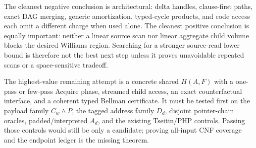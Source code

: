 \documentclass[11pt]{article}
\begin{document}
The cleanest negative conclusion is architectural: delta handles,
clause-first paths, exact DAG merging, generic amortization, typed-cycle
products, and code access each omit a different charge when used alone.  The
cleanest positive conclusion is equally important: neither a linear source
scan nor linear aggregate child volume blocks the desired Williams region.
Searching for a stronger source-read lower bound is therefore not the best
next step unless it proves unavoidable repeated scans or a space-sensitive
tradeoff.

The highest-value remaining attempt is a concrete shared $H(A,F)$ with a
one-pass or few-pass Acquire phase, streamed child access, an exact
counterfactual interface, and a coherent typed Bellman certificate.  It must
be tested first on the payload family $C_w\wedge P$, the tagged address family
$D_d$, disjoint pointer-chain oracles, padded/interpreted $A_d$, and the
existing Tseitin/PHP controls.  Passing those controls would still be only a
candidate; proving all-input CNF coverage and the endpoint ledger is the
missing theorem.

\end{document}

